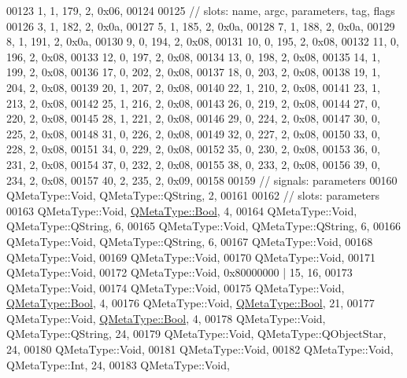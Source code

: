 \begin{DoxyCode}
00123        1,    1,  179,    2, 0x06,
00124 
00125  \textcolor{comment}{// slots: name, argc, parameters, tag, flags}
00126        3,    1,  182,    2, 0x0a,
00127        5,    1,  185,    2, 0x0a,
00128        7,    1,  188,    2, 0x0a,
00129        8,    1,  191,    2, 0x0a,
00130        9,    0,  194,    2, 0x08,
00131       10,    0,  195,    2, 0x08,
00132       11,    0,  196,    2, 0x08,
00133       12,    0,  197,    2, 0x08,
00134       13,    0,  198,    2, 0x08,
00135       14,    1,  199,    2, 0x08,
00136       17,    0,  202,    2, 0x08,
00137       18,    0,  203,    2, 0x08,
00138       19,    1,  204,    2, 0x08,
00139       20,    1,  207,    2, 0x08,
00140       22,    1,  210,    2, 0x08,
00141       23,    1,  213,    2, 0x08,
00142       25,    1,  216,    2, 0x08,
00143       26,    0,  219,    2, 0x08,
00144       27,    0,  220,    2, 0x08,
00145       28,    1,  221,    2, 0x08,
00146       29,    0,  224,    2, 0x08,
00147       30,    0,  225,    2, 0x08,
00148       31,    0,  226,    2, 0x08,
00149       32,    0,  227,    2, 0x08,
00150       33,    0,  228,    2, 0x08,
00151       34,    0,  229,    2, 0x08,
00152       35,    0,  230,    2, 0x08,
00153       36,    0,  231,    2, 0x08,
00154       37,    0,  232,    2, 0x08,
00155       38,    0,  233,    2, 0x08,
00156       39,    0,  234,    2, 0x08,
00157       40,    2,  235,    2, 0x09,
00158 
00159  \textcolor{comment}{// signals: parameters}
00160     QMetaType::Void, QMetaType::QString,    2,
00161 
00162  \textcolor{comment}{// slots: parameters}
00163     QMetaType::Void, \hyperlink{a00004_a76a8b016e5ad61faf9062cc387df5016}{QMetaType::Bool},    4,
00164     QMetaType::Void, QMetaType::QString,    6,
00165     QMetaType::Void, QMetaType::QString,    6,
00166     QMetaType::Void, QMetaType::QString,    6,
00167     QMetaType::Void,
00168     QMetaType::Void,
00169     QMetaType::Void,
00170     QMetaType::Void,
00171     QMetaType::Void,
00172     QMetaType::Void, 0x80000000 | 15,   16,
00173     QMetaType::Void,
00174     QMetaType::Void,
00175     QMetaType::Void, \hyperlink{a00004_a76a8b016e5ad61faf9062cc387df5016}{QMetaType::Bool},    4,
00176     QMetaType::Void, \hyperlink{a00004_a76a8b016e5ad61faf9062cc387df5016}{QMetaType::Bool},   21,
00177     QMetaType::Void, \hyperlink{a00004_a76a8b016e5ad61faf9062cc387df5016}{QMetaType::Bool},    4,
00178     QMetaType::Void, QMetaType::QString,   24,
00179     QMetaType::Void, QMetaType::QObjectStar,   24,
00180     QMetaType::Void,
00181     QMetaType::Void,
00182     QMetaType::Void, QMetaType::Int,   24,
00183     QMetaType::Void,

\end{DoxyCode}
